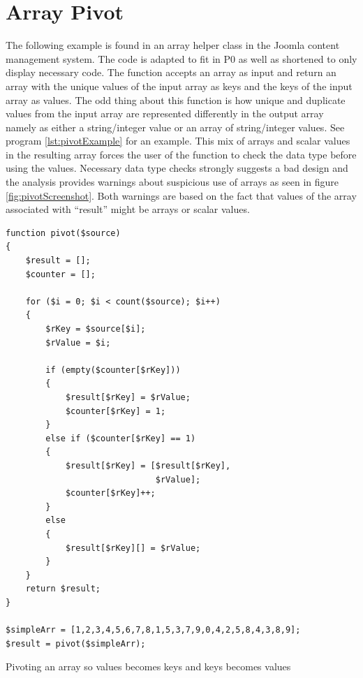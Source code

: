 \section{Array Pivot}
The following example is found in an array helper class in the Joomla content management system. The code is adapted to fit in P0 as well as shortened to only display necessary code. The function accepts an array as input and return an array with the unique values of the input array as keys and the keys of the input array as values. The odd thing about this function is how unique and duplicate values from the input array are represented differently in the output array namely as either a string/integer value or an array of string/integer values. See program \ref{lst:pivotExample} for an example. This mix of arrays and scalar values in the resulting array forces the user of the function to check the data type before using the values. Necessary data type checks strongly suggests a bad design and the analysis provides warnings about suspicious use of arrays as seen in figure \ref{fig:pivotScreenshot}. Both warnings are based on the fact that values of the array associated with ``result'' might be arrays or scalar values.


\begin{program}
\begin{lstlisting}
function pivot($source)
{
    $result = [];
    $counter = [];

    for ($i = 0; $i < count($source); $i++)
    {
        $rKey = $source[$i];
        $rValue = $i;

        if (empty($counter[$rKey]))
        {
            $result[$rKey] = $rValue;
            $counter[$rKey] = 1;
        }
        else if ($counter[$rKey] == 1)
        {
            $result[$rKey] = [$result[$rKey],
                              $rValue];
            $counter[$rKey]++;
        }
        else
        {
            $result[$rKey][] = $rValue;
        }
    }
    return $result;
}

$simpleArr = [1,2,3,4,5,6,7,8,1,5,3,7,9,0,4,2,5,8,4,3,8,9];
$result = pivot($simpleArr);
\end{lstlisting}
\caption{Pivoting an array so values becomes keys and keys becomes values}
\label{lst:pivot}
\end{program}

